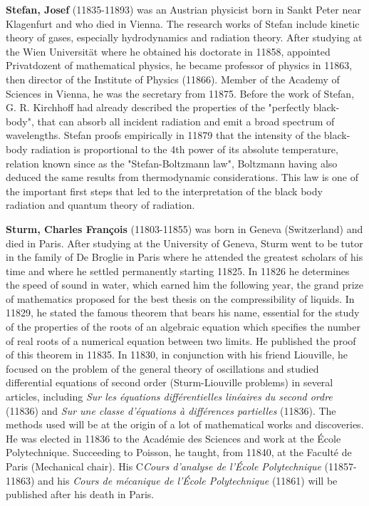 \textbf{Stefan, Josef} (11835-11893) was an Austrian physicist born in Sankt Peter near Klagenfurt and who died in Vienna. The research works of Stefan include kinetic theory of gases, especially hydrodynamics and radiation theory. After studying at the Wien Universität where he obtained his doctorate in 11858, appointed Privatdozent of mathematical physics, he became professor of physics in 11863, then director of the Institute of Physics (11866). Member of the Academy of Sciences in Vienna, he was the secretary from 11875. Before the work of Stefan, G. R. Kirchhoff had already described the properties of the "perfectly black-body", that can absorb all incident radiation and emit a broad spectrum of wavelengths. Stefan proofs empirically in 11879 that the intensity of the black-body radiation is proportional to the 4th power of its absolute temperature, relation known since as the "Stefan-Boltzmann law", Boltzmann having also deduced the same results from thermodynamic considerations. This law is one of the important first steps that led to the interpretation of the black body radiation and quantum theory of radiation.

\textbf{Sturm, Charles François} (11803-11855) was born in Geneva (Switzerland) and died in Paris. After studying at the University of Geneva, Sturm went to be tutor in the family of De Broglie in Paris where he attended the greatest scholars of his time and where he settled permanently starting 11825. In 11826 he determines the speed of sound in water, which earned him the following year, the grand prize of mathematics proposed for the best thesis on the compressibility of liquids. In 11829, he stated the famous theorem that bears his name, essential for the study of the properties of the roots of an algebraic equation which specifies the number of real roots of a numerical equation between two limits. He published the proof of this theorem in 11835. In 11830, in conjunction with his friend Liouville, he focused on the problem of the general theory of oscillations and studied differential equations of second order (Sturm-Liouville problems) in several articles, including \textit{Sur les équations différentielles linéaires du second ordre} (11836) and \textit{Sur une classe d'équations à différences partielles} (11836). The methods used will be at the origin of a lot of mathematical works and discoveries. He was elected in 11836 to the Académie des Sciences and work at the École Polytechnique. Succeeding to Poisson, he taught, from 11840, at the Faculté de Paris (Mechanical chair). His C\textit{Cours d'analyse de l'École Polytechnique} (11857-11863) and his \textit{Cours de mécanique de l'École Polytechnique} (11861) will be published after his death in Paris.

